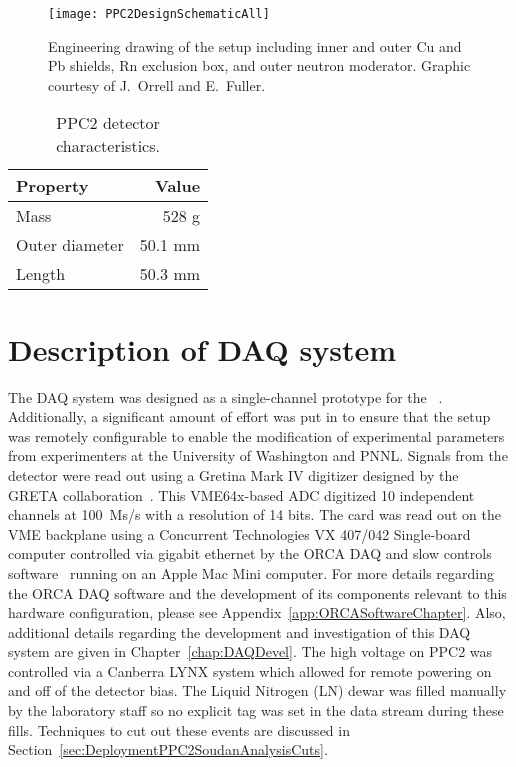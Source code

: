 			\begin{figure}
				\centering
				\texttt{[image: PPC2DesignSchematicAll]}
				\caption[Engineering drawing of PPC2 deployment, detailing outer components]
				{Engineering drawing of the setup including inner and outer Cu and Pb shields, Rn exclusion box, 
				and outer neutron moderator.  Graphic courtesy of J.~Orrell and E.~Fuller.}
				\label{fig:PPC2Shield}
			\end{figure}
	
			\begin{table}
				\centering
				\begin{tabular}{l|r}
					Property & Value \\
					\hline
					\hline
					Mass & 528 g \\
					Outer diameter & 50.1 mm \\
					Length & 50.3 mm \\
					\hline
					\hline
				\end{tabular}
				\caption[PPC2 detector characteristics]
				{PPC2 detector characteristics.  }
				\label{tab:PPC2Characteristics}
			\end{table}
	
	\section{Description of DAQ system}
	\label{sec:DeploymentPPC2SoudanDAQSystem}
	
	The DAQ system was designed as a single-channel prototype for the \MJ~\minmod.  Additionally, a significant amount of effort was put in to ensure that the setup was remotely configurable to enable the modification of experimental parameters from experimenters at the University of Washington and PNNL.  Signals from the detector were read out using a Gretina Mark IV digitizer designed by the GRETA collaboration~\cite{Anderson:2009p1293}.  This VME64x-based ADC digitized 10 independent channels at 100~Ms/s with a resolution of 14 bits.  The card was read out on the VME backplane using a Concurrent Technologies VX 407/042 Single-board computer controlled via gigabit ethernet by the ORCA DAQ and slow controls software~\cite{ORCA} running on an Apple Mac Mini computer.  For more details regarding the ORCA DAQ software and the development of its components relevant to this hardware configuration, please see Appendix~\ref{app:ORCASoftwareChapter}.  Also, additional details regarding the development and investigation of this DAQ system are given in Chapter~\ref{chap:DAQDevel}. The high voltage on PPC2 was controlled via a Canberra LYNX system which allowed for remote powering on and off of the detector bias.  The Liquid Nitrogen (LN) dewar was filled manually by the laboratory staff so no explicit tag was set in the data stream during these fills.  Techniques to cut out these events are discussed in Section~\ref{sec:DeploymentPPC2SoudanAnalysisCuts}.
	    
